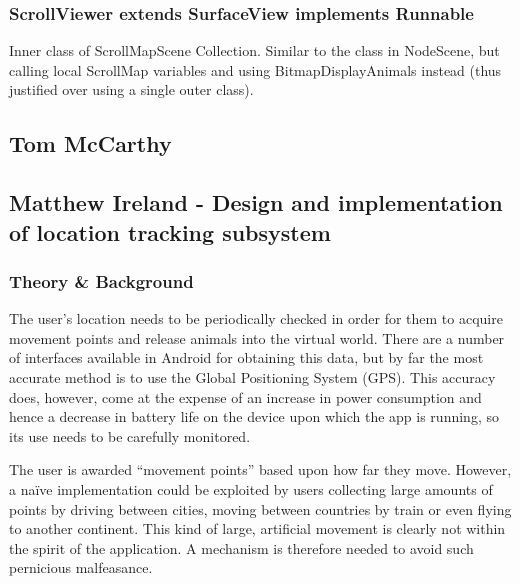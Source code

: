 \documentclass[12pt,a4paper,twoside]{article}
\begin{document}
\subsubsection{ScrollViewer extends SurfaceView implements Runnable}

Inner class of ScrollMapScene Collection. Similar to the class in NodeScene, but calling local ScrollMap variables and using BitmapDisplayAnimals instead (thus justified over using a single outer class).





\subsection{Tom McCarthy}

\subsection{Matthew Ireland - Design and implementation of location tracking subsystem}
\subsubsection{Theory \& Background}
The user's location needs to be periodically checked in order for them to acquire movement points and release animals into the virtual world. There are a number of interfaces available in Android for obtaining this data, but by far the most accurate method is to use the Global Positioning System (GPS). This accuracy does, however, come at the expense of an increase in power consumption and hence a decrease in battery life on the device upon which the app is running, so its use needs to be carefully monitored.

The user is awarded ``movement points'' based upon how far they move. However, a na\"{i}ve implementation could be exploited by users collecting large amounts of points by driving between cities, moving between countries by train or even flying to another continent. This kind of large, artificial movement is clearly not within the spirit of the application. A mechanism is therefore needed to avoid such pernicious malfeasance.
\end{document}
